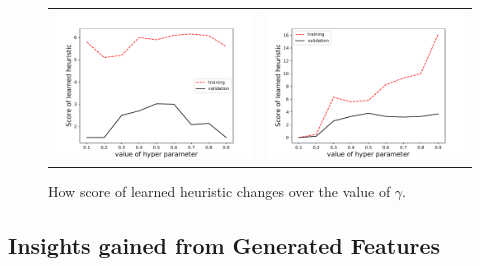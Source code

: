 \begin{figure}
	\centering
	\begin{tabular}{cc}
		\includegraphics[width=7cm]{figures/ctx_gamma.pdf} &
		\includegraphics[width=7cm]{figures/heap_gamma.pdf}
	\end{tabular}
	\caption{How score of learned heuristic changes over the value
        of $\gamma$.}
	\label{fig:gamma}
\end{figure}





\subsection{Insights gained from Generated Features}


